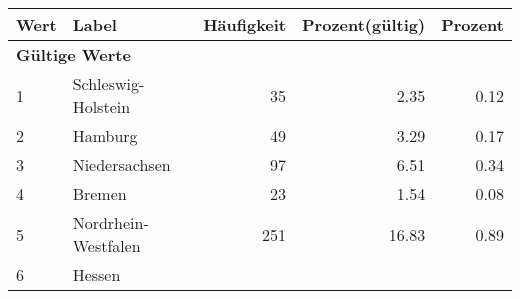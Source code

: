     \begin{longtable}{lXrrr}
     \toprule
     \textbf{Wert} & \textbf{Label} & \textbf{Häufigkeit} & \textbf{Prozent(gültig)} & \textbf{Prozent} \\
     \endhead
     \midrule
     \multicolumn{5}{l}{\textbf{Gültige Werte}}\\

     1 &
     \multicolumn{1}{X}{ Schleswig-Holstein   } &


       \num{35} &
       \num[round-mode=places,round-precision=2]{2,35} &
         \num[round-mode=places,round-precision=2]{0,12} \\

     2 &
     \multicolumn{1}{X}{ Hamburg   } &


       \num{49} &
       \num[round-mode=places,round-precision=2]{3,29} &
         \num[round-mode=places,round-precision=2]{0,17} \\

     3 &
     \multicolumn{1}{X}{ Niedersachsen   } &


       \num{97} &
       \num[round-mode=places,round-precision=2]{6,51} &
         \num[round-mode=places,round-precision=2]{0,34} \\

     4 &
     \multicolumn{1}{X}{ Bremen   } &


       \num{23} &
       \num[round-mode=places,round-precision=2]{1,54} &
         \num[round-mode=places,round-precision=2]{0,08} \\

     5 &
     \multicolumn{1}{X}{ Nordrhein-Westfalen   } &


       \num{251} &
       \num[round-mode=places,round-precision=2]{16,83} &
         \num[round-mode=places,round-precision=2]{0,89} \\

     6 &
     \multicolumn{1}{X}{ Hessen   } &



\end{longtable}
